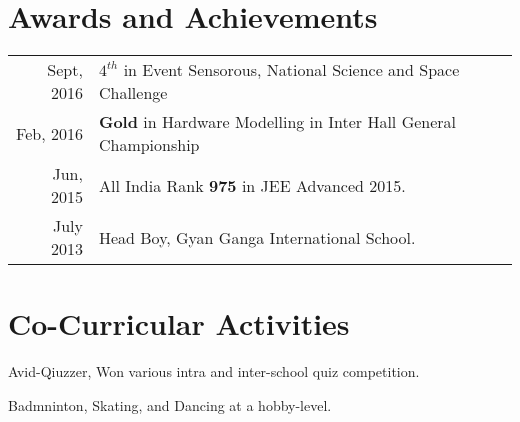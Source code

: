 \documentclass[letterpaper]{deedy-resume} %
\begin{document}
\begin{minipage}[t]{0.66\textwidth}
\section{Awards and Achievements} 

\begin{tabular}{rl}
Sept, 2016 & $4^{th}$ in Event Sensorous, National Science and Space Challenge\\
Feb, 2016 & \textbf{Gold} in Hardware Modelling in Inter Hall General Championship\\
Jun, 2015 & All India Rank \textbf{975} in JEE Advanced 2015.\\
July 2013 & Head Boy, Gyan Ganga International School.\\
\end{tabular}

\sectionspace %


\section{Co-Curricular Activities} 
\sectionspace
\sectionspace
\begin{tightitemize} 
\item Avid-Qiuzzer, Won various intra and inter-school quiz competition.
\item Badmninton, Skating, and Dancing at a hobby-level.
\end{tightitemize}




\end{minipage}
\end{document}
